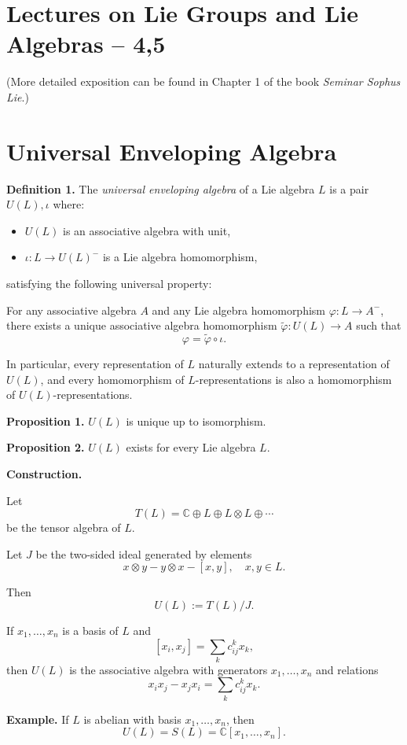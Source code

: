 \section*{Lectures on Lie Groups and Lie Algebras – 4,5}

(More detailed exposition can be found in Chapter 1 of the book
\emph{Seminar Sophus Lie}.)

\section*{Universal Enveloping Algebra}

\textbf{Definition 1.}
The \emph{universal enveloping algebra} of a Lie algebra $L$ is a pair
$U(L), \iota$ where:

\begin{itemize}
\item $U(L)$ is an associative algebra with unit,
\item $\iota : L \to U(L)^-$ is a Lie algebra homomorphism,
\end{itemize}

satisfying the following universal property:

For any associative algebra $A$ and any Lie algebra homomorphism
$\varphi : L \to A^-$, there exists a unique associative algebra
homomorphism $\tilde{\varphi} : U(L) \to A$ such that
\[
\varphi = \tilde{\varphi} \circ \iota.
\]

In particular, every representation of $L$ naturally extends to a
representation of $U(L)$, and every homomorphism of $L$-representations
is also a homomorphism of $U(L)$-representations.

\textbf{Proposition 1.}
$U(L)$ is unique up to isomorphism.

\textbf{Proposition 2.}
$U(L)$ exists for every Lie algebra $L$.

\textbf{Construction.}

Let
\[
T(L) = \mathbb{C} \oplus L \oplus L \otimes L \oplus \cdots
\]
be the tensor algebra of $L$.

Let $J$ be the two-sided ideal generated by elements
\[
x \otimes y - y \otimes x - [x,y], \quad x,y \in L.
\]

Then
\[
U(L) := T(L)/J.
\]

If $x_1,\dots,x_n$ is a basis of $L$ and
\[
[x_i,x_j] = \sum_k c_{ij}^k x_k,
\]
then $U(L)$ is the associative algebra with generators
$x_1,\dots,x_n$ and relations
\[
x_i x_j - x_j x_i = \sum_k c_{ij}^k x_k.
\]

\textbf{Example.}
If $L$ is abelian with basis $x_1,\dots,x_n$, then
\[
U(L) = S(L) = \mathbb{C}[x_1,\dots,x_n].
\]

